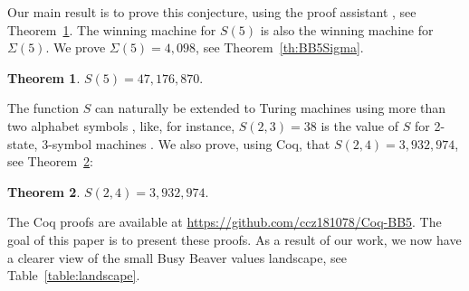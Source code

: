 \documentclass[a4paper,british]{article}
\theoremstyle{definition} %
\newtheorem{theorem}{Theorem}[section]
\numberwithin{equation}{section}
\theoremstyle{definition} %
\newcommand{\BBtheFifth}{47{,}176{,}870}
\newcommand{\SigmaTheFifth}{4{,}098}
\newcommand{\BBTxF}{3{,}932{,}974}
\begin{document}
Our main result is to prove this conjecture, using the \Coq proof assistant \cite{the_coq_development_team_2024_14542673}, see Theorem~\ref{th:BB5}. The winning machine for $S(5)$ is also the winning machine for $\Sigma(5)$. We prove $\Sigma(5) = \SigmaTheFifth$, see Theorem~\ref{th:BB5Sigma}.

\begin{theorem}\label{th:BB5}
    $S(5) = \BBtheFifth$.
\end{theorem}

The function $S$ can naturally be extended to Turing machines using more than two alphabet symbols \cite{BradyMeaningOfLife}, like, for instance, $S(2,3) = 38$ is the value of $S$ for 2-state, 3-symbol machines \cite{BradyMeaningOfLife, MICHEL200445, LafittePapazian2007}. We also prove, using Coq, that $S(2,4) = \BBTxF$, see Theorem~\ref{th:BB2x4}:

\begin{theorem}\label{th:BB2x4}
    $S(2,4) = \BBTxF$.
\end{theorem}

The Coq proofs are available at \url{https://github.com/ccz181078/Coq-BB5}. The goal of this paper is to present these proofs. As a result of our work, we now have a clearer view of the small Busy Beaver values landscape, see Table~\ref{table:landscape}.
\end{document}
